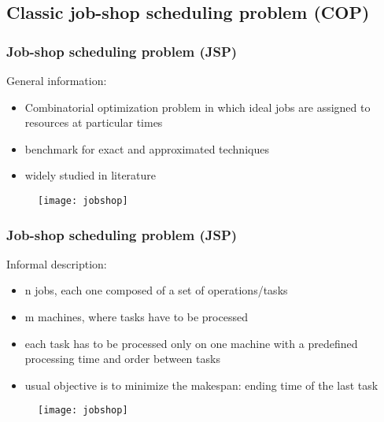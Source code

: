 \subsection{Classic job-shop scheduling problem (COP)}

\begin{frame} \frametitle{Job-shop scheduling problem (JSP)}
\pause
General information:\pause
\begin{itemize}[<+->]
\item Combinatorial optimization problem in which ideal jobs are assigned to resources at particular times
\item benchmark for exact and approximated techniques
\item widely studied in literature 
\end{itemize}

\pause\medskip

\begin{figure}
\centering
\texttt{[image: jobshop]}
\end{figure}




\end{frame}

\begin{frame} \frametitle{Job-shop scheduling problem (JSP)}
\pause
Informal description:\pause
\begin{itemize}[<+->]
\item n jobs, each one composed of a set of operations/tasks
\item m machines, where tasks have to be processed
\item each task has to be processed only on one machine with a predefined processing time and order between tasks
\item usual objective is to minimize the makespan: ending time of the last task
\end{itemize}

\medskip

\begin{figure}
\centering
\texttt{[image: jobshop]}
\end{figure}

\end{frame}

